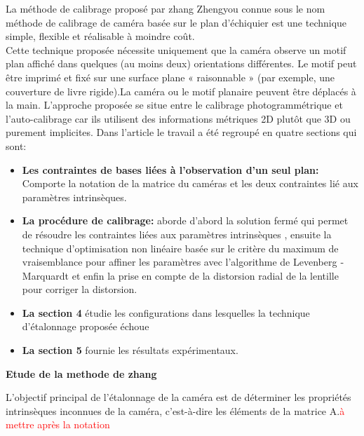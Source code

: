\documentclass[12pt,a4paper]{report}
\begin{document}
La méthode de calibrage proposé par zhang Zhengyou connue sous le nom méthode de calibrage de caméra basée sur le plan d'échiquier est une technique simple, flexible et réalisable à moindre coût.\\ 
Cette technique proposée nécessite uniquement que la caméra observe un motif plan affiché dans quelques (au moins deux) orientations
différentes. Le motif peut être imprimé et fixé sur une surface plane « raisonnable » (par exemple, une couverture de livre rigide).La caméra ou le motif planaire peuvent être déplacés à la main. L'approche proposée se situe entre le calibrage photogrammétrique et l'auto-calibrage car ils utilisent des informations métriques 2D plutôt que 3D ou purement implicites. Dans l'article le travail a été regroupé en quatre sections qui sont: 
\begin{itemize}
	\item \textbf{Les contraintes de bases liées à l'observation d'un seul plan:} Comporte la notation de la matrice du caméras et les deux contraintes lié aux paramètres intrinsèques.\\
	
	\item \textbf{La procédure de calibrage:}  aborde d'abord la solution fermé qui permet de résoudre les contraintes liées aux paramètres intrinsèques , ensuite la technique d'optimisation non linéaire basée sur le critère du maximum de vraisemblance pour affiner les paramètres avec l'algorithme de Levenberg ­Marquardt et enfin la prise en compte de la distorsion radial de la lentille pour corriger la distorsion.\\
	
	\item \textbf{La section 4} étudie les configurations dans lesquelles la technique d'étalonnage proposée échoue\\
	
	\item \textbf{La section 5} fournie les résultats expérimentaux.
	 
	 
\end{itemize}



\begin{center}
	\textbf{Etude de la methode de zhang}
\end{center}

L'objectif principal de l'étalonnage de la caméra est de déterminer les propriétés intrinsèques inconnues de la caméra, c'est-à-dire les éléments de la matrice A.\textcolor{red}{à mettre après la notation}
\end{document}
